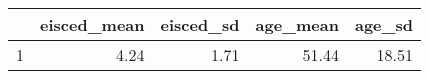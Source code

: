 \begin{table}[ht]
\centering
\begin{tabular}{rrrrr}
  \hline
 & eisced\_mean & eisced\_sd & age\_mean & age\_sd \\ 
  \hline
1 & 4.24 & 1.71 & 51.44 & 18.51 \\ 
   \hline
\end{tabular}
\end{table}
